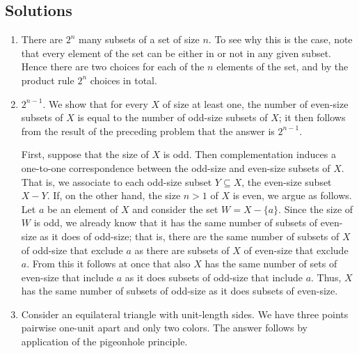 \newpage
\begin{mdframed}[linewidth=1]
\section*{Solutions}
\begin{enumerate}
    \item There are $2^n$ many subsets of a set of size $n$. To see why this is the case, note that every element of the set can be either in or not in any given subset. Hence there are two choices for each of the $n$ elements of the set, and by the product rule $2^n$ choices in total. 

    \item $2^{n-1}$. 
    We show that for every $X$ of size at least one, the number of even-size subsets of $X$ is equal to the number of odd-size subsets of $X$; it then follows from the result of the preceding problem that the answer is $2^{n-1}$. 
    
    First, suppose that the size of $X$ is odd. Then complementation induces a one-to-one correspondence between the odd-size and even-size subsets of $X$. That is, we associate to each odd-size subset $Y\subseteq X$, the even-size subset $X-Y$. If, on the other hand, the size $n>1$ of $X$ is even, we argue as follows. Let $a$ be an element of $X$ and consider the set $W=X-\{a\}$. Since the size of $W$ is odd, we already know that it has the same number of subsets of even-size as it does of odd-size; that is, there are the same number of subsets of $X$ of odd-size that exclude $a$ as there are subsets of $X$ of even-size that exclude $a$.  From this it follows at once that also $X$ has the same number of sets of even-size that include $a$ as it does subsets of odd-size that include $a$. Thus, $X$ has the same number of subsets of odd-size as it does subsets of even-size.
    

    \item Consider an equilateral triangle with unit-length sides. We have three points pairwise one-unit apart and only two colors. The answer follows by application of the pigeonhole principle. 


\end{enumerate}
\end{mdframed}
